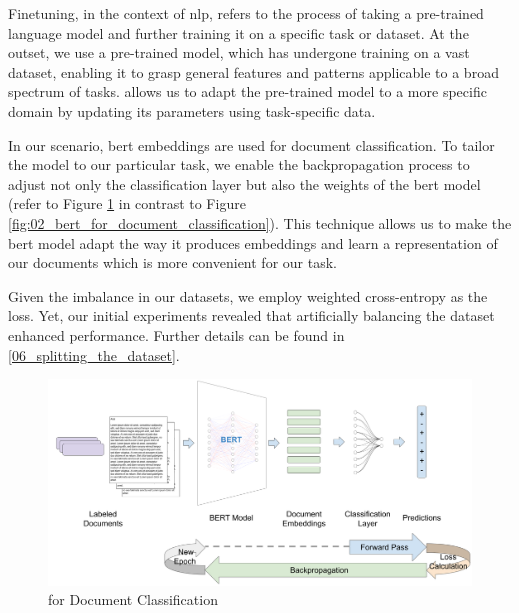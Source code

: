 \label{06_finetuning}

Finetuning, in the context of \gls{nlp}, refers to the process of taking a pre-trained language model and further training it on a specific task or dataset. At the outset, we use a pre-trained model, which has undergone training on a vast dataset, enabling it to grasp general features and patterns applicable to a broad spectrum of tasks. \finetuning{} allows us to adapt the pre-trained model to a more specific domain by updating its parameters using task-specific data.


In our scenario, \gls{bert} embeddings are used for document classification. To tailor the model to our particular task, we enable the backpropagation process to adjust not only the classification layer but also the weights of the \gls{bert} model (refer to Figure \ref{fig:06_finetuning_bert_for_document_classification} in contrast to Figure \ref{fig:02_bert_for_document_classification}). This technique allows us to make the  \gls{bert} model adapt the way it produces embeddings and learn a representation of our documents which is more convenient for our task.

Given the imbalance in our datasets, we employ weighted cross-entropy as the loss. Yet, our initial experiments revealed that artificially balancing the dataset enhanced performance. Further details can be found in \headerName{} \ref{06_splitting_the_dataset}.


\begin{figure}
    \centering
    \includegraphics[width=\textwidth]{Figures/06/06_BERT_finetuning.png}
    \caption{\finetuning{} \BERT{} for Document Classification}
    \label{fig:06_finetuning_bert_for_document_classification}
\end{figure}
